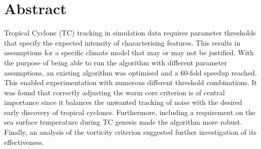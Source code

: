 
 \setcounter{tocdepth}{2}
 \tableofcontents



\chapter*{Abstract}
Tropical Cyclone (TC) tracking in simulation data requires parameter thresholds that specify the expected intensity of characterising features. This results in assumptions for a specific climate model that may or may not be justified. With the purpose of being able to run the algorithm with different parameter assumptions, an existing algorithm was optimised and a 60-fold speedup reached. This enabled experimentation with numerous different threshold combinations. It was found that correctly adjusting the warm core criterion is of central importance since it balances the unwanted tracking of noise with the desired early discovery of tropical cyclones. Furthermore, including a requirement on the sea surface temperature during TC genesis made the algorithm more robust. Finally, an analysis of the vorticity criterion suggested further investigation of its effectiveness.